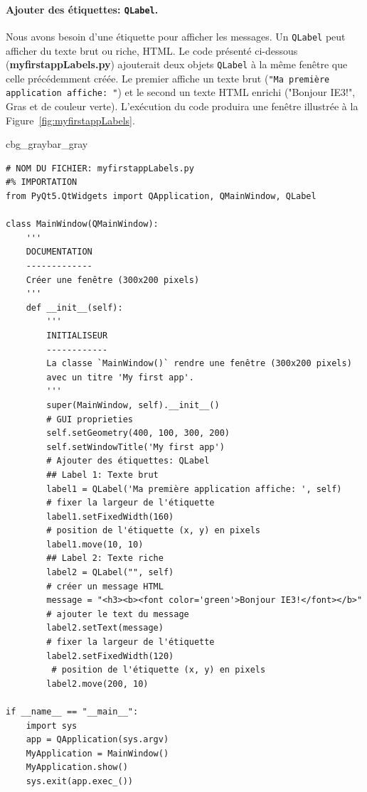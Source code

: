\documentclass[%
oneside,                 %
final,                   %
10pt,french]{article}
\newenvironment{_pro_tight}[2]{
   \def\FrameCommand{\color{#2}\vrule width 1mm\normalcolor\colorbox{#1}}
   \FrameRule0.6pt\MakeFramed {\advance\hsize-2mm\FrameRestore}\vskip3mm}
   {\vskip0mm\endMakeFramed}
\newenvironment{pro}[2]{
\bgroup\rmfamily
\fboxsep=0mm\relax
\begin{_pro_tight}{#1}{#2}
\list{}{\parsep=-2mm\parskip=0mm\topsep=0pt\leftmargin=2mm
\rightmargin=2\leftmargin\leftmargin=4pt\relax}
\item\relax}
{\endlist\end{_pro_tight}\egroup}
\begin{document}
\paragraph{Ajouter des étiquettes: \texttt{QLabel}.}
Nous avons besoin d'une étiquette pour afficher les messages. Un \texttt{QLabel} peut afficher du texte brut ou riche, HTML. Le code présenté ci-dessous (\textbf{myfirstappLabels.py}) ajouterait deux objets \texttt{QLabel} à la même fenêtre que celle précédemment créée. Le premier affiche un texte brut (\texttt{"Ma première application affiche: "}) et le second un texte HTML enrichi ("Bonjour IE3!", Gras et de couleur verte). L'exécution du code produira une fenêtre illustrée à la Figure~\ref{fig:myfirstappLabels}.
\begin{pro}{cbg_gray}{bar_gray}\begin{verbatim}
# NOM DU FICHIER: myfirstappLabels.py
#% IMPORTATION
from PyQt5.QtWidgets import QApplication, QMainWindow, QLabel

class MainWindow(QMainWindow):
    '''
    DOCUMENTATION
    -------------
    Créer une fenêtre (300x200 pixels)
    '''
    def __init__(self):
        '''
        INITIALISEUR 
        ------------
        La classe `MainWindow()` rendre une fenêtre (300x200 pixels) 
        avec un titre 'My first app'.
        '''
        super(MainWindow, self).__init__()
        # GUI proprieties
        self.setGeometry(400, 100, 300, 200)
        self.setWindowTitle('My first app')
        # Ajouter des étiquettes: QLabel
        ## Label 1: Texte brut
        label1 = QLabel('Ma première application affiche: ', self)
        # fixer la largeur de l'étiquette
        label1.setFixedWidth(160)
        # position de l'étiquette (x, y) en pixels
        label1.move(10, 10)
        ## Label 2: Texte riche
        label2 = QLabel("", self)
        # créer un message HTML
        message = "<h3><b><font color='green'>Bonjour IE3!</font></b>"
        # ajouter le text du message 
        label2.setText(message)
        # fixer la largeur de l'étiquette
        label2.setFixedWidth(120)
         # position de l'étiquette (x, y) en pixels
        label2.move(200, 10)

if __name__ == "__main__":
    import sys
    app = QApplication(sys.argv)
    MyApplication = MainWindow()
    MyApplication.show()
    sys.exit(app.exec_())
\end{verbatim}
\end{pro}
\noindent
\end{document}
